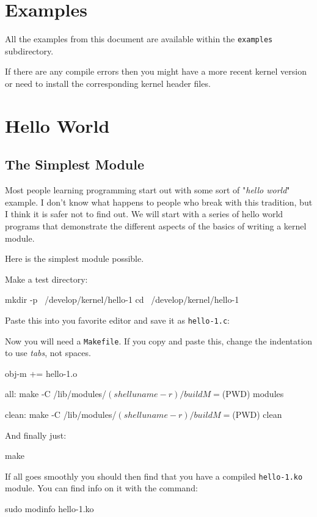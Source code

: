 \documentclass[10pt, oneside]{book}
\begin{document}
\section{Examples}
\label{sec:examples}
All the examples from this document are available within the \verb|examples| subdirectory.

If there are any compile errors then you might have a more recent kernel version or need to install the corresponding kernel header files.

\section{Hello World}
\label{sec:helloworld}
\subsection{The Simplest Module}
\label{sec:org2d3e245}
Most people learning programming start out with some sort of "\emph{hello world}" example.
I don't know what happens to people who break with this tradition, but I think it is safer not to find out.
We will start with a series of hello world programs that demonstrate the different aspects of the basics of writing a kernel module.

Here is the simplest module possible.

Make a test directory:
\begin{codebash}
mkdir -p ~/develop/kernel/hello-1
cd ~/develop/kernel/hello-1
\end{codebash}

Paste this into you favorite editor and save it as \verb|hello-1.c|:


Now you will need a \verb|Makefile|. If you copy and paste this, change the indentation to use \textit{tabs}, not spaces.

\begin{code}
obj-m += hello-1.o

all:
	make -C /lib/modules/$(shell uname -r)/build M=$(PWD) modules

clean:
	make -C /lib/modules/$(shell uname -r)/build M=$(PWD) clean
\end{code}

And finally just:
\begin{codebash}
make
\end{codebash}

If all goes smoothly you should then find that you have a compiled \verb|hello-1.ko| module.
You can find info on it with the command:
\begin{codebash}
sudo modinfo hello-1.ko
\end{codebash}
\end{document}
